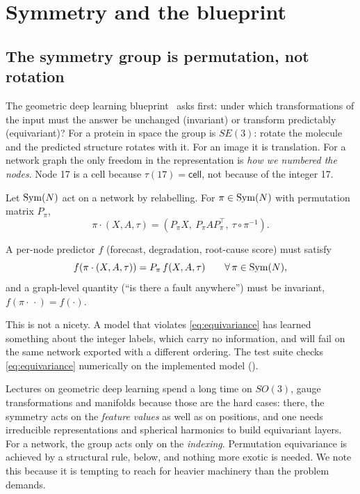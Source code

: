 \chapter{Symmetry and the blueprint}
\label{ch:symmetry}

\section{The symmetry group is permutation, not rotation}
The geometric deep learning blueprint~\cite{bronstein2021} asks first: under which transformations
of the input must the answer be unchanged (invariant) or transform predictably (equivariant)? For a
protein in space the group is $SE(3)$: rotate the molecule and the predicted structure rotates with
it. For an image it is translation. For a network graph the only freedom in the representation is
\emph{how we numbered the nodes}. Node 17 is a cell because $\tau(17)=\textsf{cell}$, not because of
the integer 17.

\begin{definition}
Let $\mathrm{Sym}(N)$ act on a network by relabelling. For $\pi\in\mathrm{Sym}(N)$ with permutation matrix $P_\pi$,
\begin{equation}
\pi\cdot(X,A,\tau)=(P_\pi X,\ P_\pi A P_\pi^{\top},\ \tau\circ\pi^{-1}).
\label{eq:action}
\end{equation}
\end{definition}

\begin{assumption}
A per-node predictor $f$ (forecast, degradation, root-cause score) must satisfy
\begin{equation}
f(\pi\cdot(X,A,\tau))=P_\pi\,f(X,A,\tau)\qquad\forall\,\pi\in\mathrm{Sym}(N),
\label{eq:equivariance}
\end{equation}
and a graph-level quantity (``is there a fault anywhere'') must be invariant, $f(\pi\cdot\,\cdot)=f(\cdot)$.
\end{assumption}

This is not a nicety. A model that violates \eqref{eq:equivariance} has learned something about
the integer labels, which carry no information, and will fail on the same network exported with a
different ordering. The test suite checks \eqref{eq:equivariance} numerically on the implemented
model ().

\begin{remark}
Lectures on geometric deep learning spend a long time on $SO(3)$, gauge transformations and
manifolds because those are the hard cases: there, the symmetry acts on the \emph{feature values}
as well as on positions, and one needs irreducible representations and spherical harmonics to
build equivariant layers. For a network, the group acts only on the \emph{indexing}. Permutation
equivariance is achieved by a structural rule, below, and nothing more exotic is needed. We note
this because it is tempting to reach for heavier machinery than the problem demands.
\end{remark}

